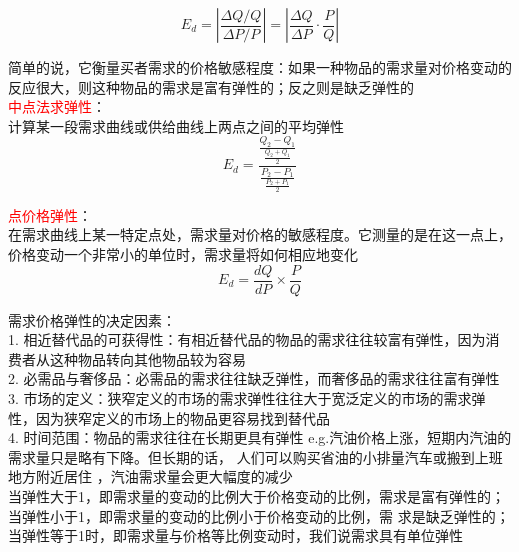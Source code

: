 \documentclass[12pt,a4paper]{article}
\begin{document}
$$E_d = \left| \frac{\Delta Q / Q}{\Delta P / P} \right| = \left| \frac{\Delta Q}{\Delta P} \cdot \frac{P}{Q} \right|$$

简单的说，它衡量买者需求的价格敏感程度：如果一种物品的需求量对价格变动的反应很大，则这种物品的需求是富有弹性的；反之则是缺乏弹性的\\

\textcolor{red}{中点法求弹性}：\\

计算某一段需求曲线或供给曲线上两点之间的平均弹性\\

$$E_d = \frac{\frac{Q_2 - Q_1}{\frac{Q_2 + Q_1}{2}}}{\frac{P_2 - P_1}{\frac{P_2 + P_1}{2}}}$$

\textcolor{red}{点价格弹性}：\\

在需求曲线上某一特定点处，需求量对价格的敏感程度。它测量的是在这一点上，价格变动一个非常小的单位时，需求量将如何相应地变化\\

$$E_d = \frac{dQ}{dP} \times \frac{P}{Q}$$

需求价格弹性的决定因素：\\
1. 相近替代品的可获得性：有相近替代品的物品的需求往往较富有弹性，因为消费者从这种物品转向其他物品较为容易\\
2. 必需品与奢侈品：必需品的需求往往缺乏弹性，而奢侈品的需求往往富有弹性\\
3. 市场的定义：狭窄定义的市场的需求弹性往往大于宽泛定义的市场的需求弹性，因为狭窄定义的市场上的物品更容易找到替代品\\
4. 时间范围：物品的需求往往在长期更具有弹性 e.g.汽油价格上涨，短期内汽油的需求量只是略有下降。但长期的话， 人们可以购买省油的小排量汽车或搬到上班地方附近居住 ，汽油需求量会更大幅度的减少\\

当弹性大于1，即需求量的变动的比例大于价格变动的比例，需求是富有弹性的；当弹性小于1，即需求量的变动的比例小于价格变动的比例，需
求是缺乏弹性的；当弹性等于1时，即需求量与价格等比例变动时，我们说需求具有单位弹性\\
\end{document}
